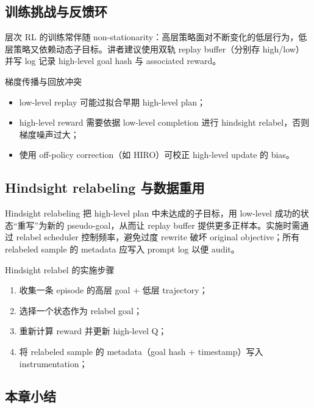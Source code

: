 \documentclass[a4paper]{article}
\begin{document}
\subsection{训练挑战与反馈环}

层次 RL 的训练常伴随 non-stationarity：高层策略面对不断变化的低层行为，低层策略又依赖动态子目标。讲者建议使用双轨 replay buffer（分别存 high/low）并写 log 记录 high-level goal hash 与 associated reward。

\begin{warningbox}{梯度传播与回放冲突}
\begin{itemize}
    \item low-level replay 可能过拟合早期 high-level plan；
    \item high-level reward 需要依据 low-level completion 进行 hindsight relabel，否则梯度噪声过大；
    \item 使用 off-policy correction（如 HIRO）可校正 high-level update 的 bias。
\end{itemize}
\end{warningbox}

\subsection{Hindsight relabeling 与数据重用}

Hindsight relabeling 把 high-level plan 中未达成的子目标，用 low-level 成功的状态“重写”为新的 pseudo-goal，从而让 replay buffer 提供更多正样本。实施时需通过 relabel scheduler 控制频率，避免过度 rewrite 破坏 original objective；所有 relabeled sample 的 metadata 应写入 prompt log 以便 audit。

\begin{importantbox}{Hindsight relabel 的实施步骤}
\begin{enumerate}
    \item 收集一条 episode 的高层 goal + 低层 trajectory；
    \item 选择一个状态作为 relabel goal；
    \item 重新计算 reward 并更新 high-level Q；
    \item 将 relabeled sample 的 metadata（goal hash + timestamp）写入 instrumentation；
\end{enumerate}
\end{importantbox}

\subsection{本章小结}
\end{document}
